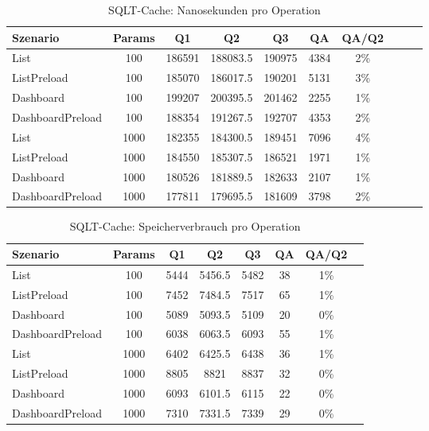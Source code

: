 
\begin{table}[ht]
\centering
\caption{SQLT-Cache: Nanosekunden pro Operation}
\begin{tabular}{lccccccccc}
\toprule
Szenario & Params & Q1 & Q2 & Q3 & QA & QA/Q2 \\
\midrule
	List & 100 & 186591 & 188083.5 & 190975 & 4384 & 2\% \\
	ListPreload & 100 & 185070 & 186017.5 & 190201 & 5131 & 3\% \\
	Dashboard & 100 & 199207 & 200395.5 & 201462 & 2255 & 1\% \\
	DashboardPreload & 100 & 188354 & 191267.5 & 192707 & 4353 & 2\% \\
	List & 1000 & 182355 & 184300.5 & 189451 & 7096 & 4\% \\
	ListPreload & 1000 & 184550 & 185307.5 & 186521 & 1971 & 1\% \\
	Dashboard & 1000 & 180526 & 181889.5 & 182633 & 2107 & 1\% \\
	DashboardPreload & 1000 & 177811 & 179695.5 & 181609 & 3798 & 2\% \\
\bottomrule
\end{tabular}
\label{tab:benchmark_sqlt-cache_nsperop}
\end{table}
	
\begin{table}[ht]
\centering
\caption{SQLT-Cache: Speicherverbrauch pro Operation}
\begin{tabular}{lccccccc}
\toprule
Szenario & Params & Q1 & Q2 & Q3 & QA & QA/Q2 \\
\midrule
	List & 100 & 5444 & 5456.5 & 5482 & 38 & 1\% \\
	ListPreload & 100 & 7452 & 7484.5 & 7517 & 65 & 1\% \\
	Dashboard & 100 & 5089 & 5093.5 & 5109 & 20 & 0\% \\
	DashboardPreload & 100 & 6038 & 6063.5 & 6093 & 55 & 1\% \\
	List & 1000 & 6402 & 6425.5 & 6438 & 36 & 1\% \\
	ListPreload & 1000 & 8805 & 8821 & 8837 & 32 & 0\% \\
	Dashboard & 1000 & 6093 & 6101.5 & 6115 & 22 & 0\% \\
	DashboardPreload & 1000 & 7310 & 7331.5 & 7339 & 29 & 0\% \\
\bottomrule
\end{tabular}
\label{tab:benchmark_sqlt-cache_bytesperop}
\end{table}
	
